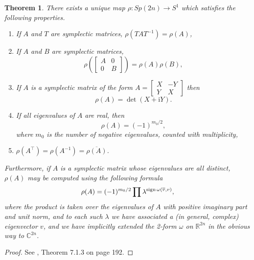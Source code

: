 \documentclass{article}
\newtheorem{theorem}{Theorem}
\theoremstyle{nonumberplain}
\newtheorem{proof}{Proof}
\newcommand{\R}{\mathbb{R}}
\newcommand{\C}{\mathbb{C}}
\newcommand{\I}{\mathrm{i}}
\DeclareMathOperator{\sign}{sign}
\let\Im\relax
\DeclareMathOperator{\Im}{Im}
\newcommand{\conj}[1]{\overline{#1}}
\newcommand{\transposed}{\top}
\begin{document}
\begin{theorem}\label{rhodef}
There exists a unique map $\rho \colon Sp(2n) \to S^1$ which satisfies the following properties.
\begin{enumerate}[label=\roman*)]
\item If $A$ and $T$ are symplectic matrices, $\rho(T A T^{-1}) = \rho(A)$,
\item If $A$ and $B$ are symplectic matrices,
\begin{equation}
\rho\left(\begin{bmatrix} A & 0 \\ 0 & B \end{bmatrix}\right) = \rho(A) \rho(B),
\end{equation}
\item\label{rhodef:xy} If $A$ is a symplectic matrix of the form $A = \begin{bmatrix} X & -Y \\ Y & X \end{bmatrix}$ then
\begin{equation}
\rho(A) = \det(X + \I Y).
\end{equation}
\item\label{rhodef:realev} If all eigenvalues of $A$ are real, then
\begin{equation}
\rho(A) = (-1)^{m_0/2},
\end{equation}
where $m_0$ is the number of negative eigenvalues, counted with multiplicity,
\item $\rho(A^\transposed) = \rho(A^{-1}) = \conj{\rho(A)}$.
\end{enumerate}

Furthermore, if $A$ is a symplectic matrix whose eigenvalues are all distinct, $\rho(A)$ may be computed using the following formula
\begin{equation}\label{rhoformula}
\rho(A) = (-1)^{m_0/2} \prod \lambda^{\sign \Im \omega(\conj v, v)},
\end{equation}
where the product is taken over the eigenvalues of $A$ with positive imaginary part and unit norm, and to each such $\lambda$ we have associated  a (in general, complex) eigenvector $v$, and we have implicitly extended the 2-form $\omega$ on $\R^{2n}$ in the obvious way to $\C^{2n}$.
\end{theorem}

\begin{proof}
See \cite{audin}, Theorem 7.1.3 on page 192.
\end{proof}
\end{document}
